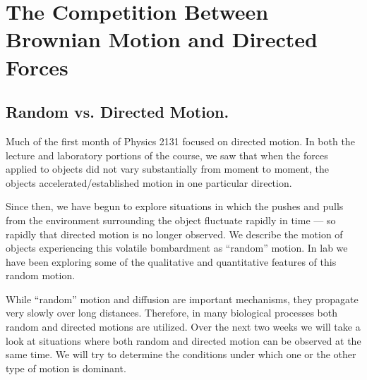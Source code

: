 \chapter{The Competition Between Brownian Motion and Directed Forces}
\thispagestyle{fancy}
\section{Random vs. Directed Motion.}
Much of the first month of Physics 2131 focused on directed motion.
In both the lecture and laboratory portions of the course, we saw that when the forces applied to objects did not vary substantially from moment to moment, the objects accelerated/established motion in one particular direction.
\par
Since then, we have begun to explore situations in which the pushes and pulls from the environment surrounding the object fluctuate rapidly in time — so rapidly that directed motion is no longer observed. 
We describe the motion of objects experiencing this volatile bombardment as ``random'' motion. 
In lab we have been exploring some of the qualitative and quantitative features of this random motion.
\par
While ``random'' motion and diffusion are important mechanisms, they propagate very slowly over long distances. 
Therefore, in many biological processes both random and directed motions are utilized. 
Over the next two weeks we will take a look at situations where both random and directed motion can be observed at the same time. 
We will try to determine the conditions under which one or the other type of motion is dominant.
